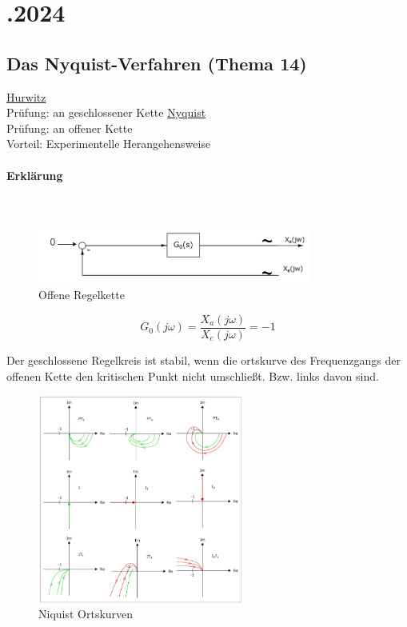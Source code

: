 \documentclass[a4paper, twoside, 11pt]{article}
\begin{document}
\newpage
\section*{.2024}
\subsection*{Das Nyquist-Verfahren (Thema 14)}
\vspace{1em}
\begin{paracol}{2}
	\underline{Hurwitz} \\
	Prüfung: an geschlossener Kette
	\switchcolumn
	\underline{Nyquist} \\
	Prüfung: an offener Kette \\
	Vorteil: Experimentelle Herangehensweise
\end{paracol}
\paragraph{Erklärung} \mbox{} \\
\begin{figure}[ht]
	\centering
	\includegraphics[width=0.8\textwidth]{2024_12_03_nyquist.png}
	\caption{Offene Regelkette}
\end{figure}
\[ G_0(j\omega) = \frac{X_a(j\omega)}{X_e(j\omega)} = -1 \]

\vspace{1em}

Der geschlossene Regelkreis ist stabil, wenn die ortskurve des Frequenzgangs der offenen Kette den kritischen Punkt nicht umschließt. Bzw. links davon sind.
\begin{figure}[ht]
	\centering
	\includegraphics[width=0.6\textwidth]{2024_12_03_nyquist_ortskurven.png}
	\caption{Niquist Ortskurven}
\end{figure}
\end{document}
